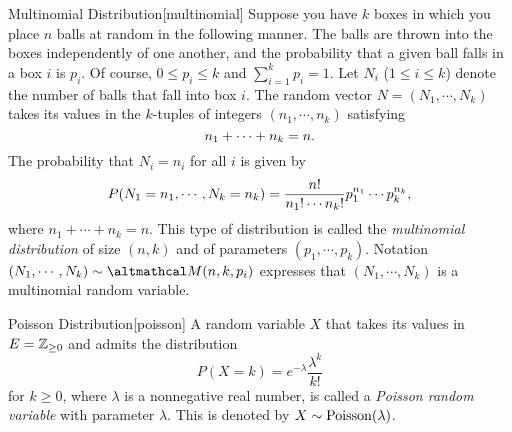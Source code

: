 \documentclass[../probability.tex]{subfiles}
\begin{document}
\begin{Example}{Multinomial Distribution}[multinomial]
    Suppose you have \(k\) boxes in which you place \(n\) balls at random in the following manner.
    The balls are thrown into the boxes independently of one another, and the probability
    that a given ball falls in a box \(i\) is \(p_i\). Of course, \(0 \le p_i \le k\) and
    \(\sum_{i=1}^k p_i = 1\).
    Let \(N_i\) (\(1 \le i \le k\)) denote the number of balls that fall into box \(i\).
    The random vector \(N = (N_1, \cdots, N_k)\) takes its values in the \(k\)-tuples
    of integers \((n_1, \cdots, n_k)\) satisfying
    \[
        n_1 + \cdots + n_k = n\text.
    \]
    The probability that \(N_i = n_i\) for all \(i\) is given by
    \[
        P(N_1 = n_1, \cdots, N_k = n_k)
        = \frac{n!}{n_1! \cdots n_k!} p_1^{n_1} \cdots p_k^{n_k}\text,
    \]
    where \(n_1 + \cdots + n_k = n\).
    This type of distribution is called the \emph{multinomial distribution} of size \((n, k)\)
    and of parameters \((p_1, \cdots, p_k)\). Notation \((N_1, \cdots, N_k) \sim \mcal{M}(n, k, p_i)\)
    expresses that \((N_1, \cdots, N_k)\) is a multinomial random variable.
\end{Example}

\begin{Example}{Poisson Distribution}[poisson]
    A random variable \(X\) that takes its values in \(E = \ZZ_{\ge 0}\) and
    admits the distribution
    \[
        P(X=k) = e^{-\lambda} \frac{\lambda^k}{k!}
    \]
    for \(k \ge 0\), where \(\lambda\) is a nonnegative real number,
    is called a \emph{Poisson random variable} with parameter \(\lambda\).
    This is denoted by \(X \sim \operatorname{Poisson}(\lambda)\).
\end{Example}
\end{document}
